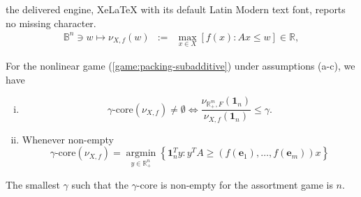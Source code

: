 \documentclass[10pt,a4paper]{amsart}
\DeclareMathOperator*{\argmin}{argmin}
\begin{document}
the delivered engine, XeLaTeX with its default Latin Modern text font, reports no missing character.
\begin{eqnarray}
\label{game:packing-subadditive}\mathbb{B}^n\ni w\mapsto \nu_{X, f}(w)&:=&\max\limits_{x\in X} \left[f(x): Ax\le w\right]\in  \mathbb{R},
\end{eqnarray}

\begin{thm}\label{thm:appro-core} For the nonlinear game (\ref{game:packing-subadditive}) under assumptions (a-c), we have
\begin{enumerate}[(i)]
\item 
\[
\gamma\text{-core}\left(\nu_{X, f}\right)\ne\emptyset \iff \frac{\nu_{\mathbb{R}^m_{+}, F}\left(\mathbf{1}_n\right)}{\nu_{X, f}\left(\mathbf{1}_n\right)}\le \gamma.
\]
\item Whenever non-empty
\[
\gamma\text{-core}\left(\nu_{X, f}\right)=\argmin\limits_{y\in\mathbb{R}^{n}_{+}}\left\{\mathbf{1}_n^Ty: y^TA\ge (f(\mathbf{e}_1),\dots, f(\mathbf{e}_m))x\right\}
\]
\end{enumerate}
\end{thm}

\begin{fact} The smallest $\gamma$ such that the $\gamma$-core is non-empty for the assortment game is $n$.
\end{fact}
\end{document}
